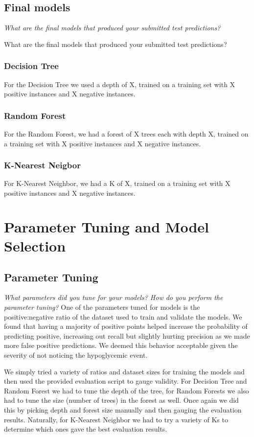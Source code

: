 \documentclass[11pt,a4paper]{article}
\begin{document}
\subsection{Final models}
\textit{What are the final models that produced your submitted test predictions?}

What are the final models that produced your submitted test predictions?
\subsubsection{Decision Tree}
For the Decision Tree we used a depth of X, trained on a training set with X positive instances and X negative instances.

\subsubsection{Random Forest}
For the Random Forest, we had a forest of X trees each with depth X, trained on a training set with X positive instances and X negative instances.

\subsubsection{K-Nearest Neigbor}
For K-Nearest Neighbor, we had a K of X, trained on a training set with X positive instances and X negative instances. 

\section{Parameter Tuning and Model Selection }

\subsection{Parameter Tuning}
\textit{What parameters did you tune for your models? How do you perform the parameter tuning?}
One of the parameters tuned for models is the positive:negative ratio of the dataset used to train and validate the models. We found that having a majority of positive points helped increase the probability of predicting positive, increasing out recall but slightly hurting precision as we made more false positive predictions. We deemed this behavior acceptable given the severity of not noticing the hypoglycemic event.

We simply tried a variety of ratios and dataset sizes for training the models and then used the provided evaluation script to gauge validity. For Decision Tree and Random Forest we had to tune the depth of the tree, for Random Forests we also had to tune the size (number of trees) in the forest as well. Once again we did this by picking depth and forest size manually and then gauging the evaluation results. Naturally, for K-Nearest Neighbor we had to try a variety of Ks to determine which ones gave the best evaluation results. 
\end{document}
